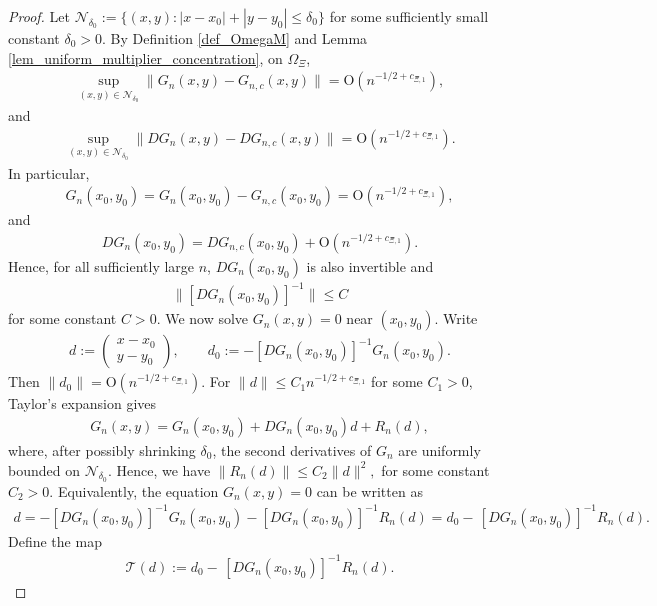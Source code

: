 \documentclass[12pt]{article}
\theoremstyle{plain}
\numberwithin{equation}{section}
\begin{document}
\begin{proof}
	Let $\mathcal N_{\delta_0}:=\{(x,y): |x-x_0|+|y-y_0|\le \delta_0\}$ for some sufficiently small constant $\delta_0>0$. By Definition \ref{def_OmegaM} and Lemma \ref{lem_uniform_multiplier_concentration}, on $\Omega_{\Xi}$,
	\begin{align*}
		\sup_{(x,y)\in\mathcal N_{\delta_0}}
		\|G_n(x,y)-G_{n,c}(x,y)\|=\mathrm{O}(n^{-1/2+c_{\Xi,1}}),
	\end{align*} 
	and
	\begin{align*}
		\sup_{(x,y)\in\mathcal N_{\delta_0}}
		\|DG_n(x,y)-DG_{n,c}(x,y)\|=\mathrm{O}(n^{-1/2+c_{\Xi,1}}).
	\end{align*}
	In particular,
	\begin{align*}
		G_n(x_0,y_0)=G_n(x_0,y_0)-G_{n,c}(x_0,y_0)=\mathrm{O}(n^{-1/2+c_{\Xi,1}}),
	\end{align*}
	and
	\begin{align*}
		DG_n(x_0,y_0)= DG_{n,c}(x_0,y_0)+\mathrm{O}(n^{-1/2+c_{\Xi,1}}).
	\end{align*}
	Hence, for all sufficiently large $n$, $DG_n(x_0,y_0)$ is also invertible and
	\begin{align*}
		\|[DG_n(x_0,y_0)]^{-1}\|\le C
	\end{align*}
	for some constant $C>0$. We now solve $G_n(x,y)=0$ near $(x_0,y_0)$. Write
	\begin{align*}
		d:=
		\begin{pmatrix}
			x-x_0\\
			y-y_0
		\end{pmatrix},
		\qquad
		d_0:=
		-[DG_n(x_0,y_0)]^{-1}G_n(x_0,y_0).
	\end{align*}
	Then $\|d_0\|=\mathrm{O}(n^{-1/2+c_{\Xi,1}})$.
	For $\|d\|\le C_1n^{-1/2+c_{\Xi,1}}$ for some $C_1>0$, Taylor's expansion gives
	\begin{align*}
		G_n(x,y)=G_n(x_0,y_0)+DG_n(x_0,y_0)d+R_n(d),
	\end{align*}
	where, after possibly shrinking $\delta_0$, the second derivatives of $G_n$ are uniformly bounded on $\mathcal N_{\delta_0}$. Hence, we have $ \|R_n(d)\|\le C_2\|d\|^2,$ for some constant $C_2>0$. Equivalently, the equation $G_n(x,y)=0$ can be written as
	\begin{align*}
		d=-[DG_n(x_0,y_0)]^{-1}G_n(x_0,y_0)-
		[DG_n(x_0,y_0)]^{-1}R_n(d)
		=
		d_0-\,[DG_n(x_0,y_0)]^{-1}R_n(d).
	\end{align*}
	Define the map
	\begin{align*}
		\mathcal T(d)
		:=
		d_0-\,[DG_n(x_0,y_0)]^{-1}R_n(d).
	\end{align*}

\end{proof}
\end{document}
